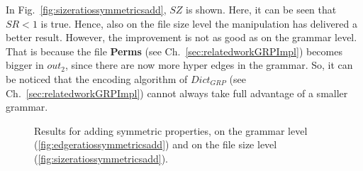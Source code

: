 In Fig.~\ref{fig:sizeratiossymmetricsadd}, $SZ$ is shown. Here, it can be seen that $SR<1$ is true. Hence, also on the file size level the manipulation has delivered a better result. However, the improvement is not as good as on the grammar level. That is because the file \textbf{Perms} (see Ch.~\ref{sec:relatedworkGRPImpl}) becomes bigger in $out_2$, since there are now more hyper edges in the grammar. So, it can be noticed that the encoding algorithm of $Dict_{GRP}$ (see Ch.~\ref{sec:relatedworkGRPImpl}) cannot always take full advantage of a smaller grammar.

\begin{figure}[h]
	\centering
	\hfill 
	\caption{Results for adding symmetric properties, on the grammar level (\ref{fig:edgeratiossymmetricsadd}) and on the file size level (\ref{fig:sizeratiossymmetricsadd}).}
	\label{fig:symmetricAddResults}
\end{figure}

